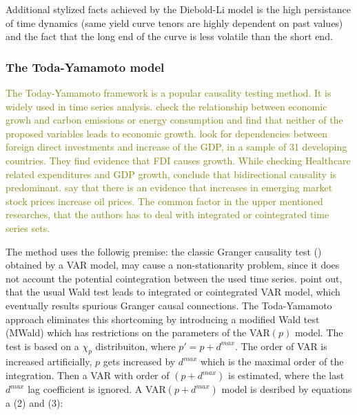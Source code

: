 \documentclass[12pt,bibliography=totoc]{article}
\begin{document}
Additional stylized facts achieved by the Diebold-Li model is the high persistance of time dynamics (same yield curve tenors are highly dependent on past values) and the fact that the long end of the curve is less volatile than the short end.


\subsubsection{The Toda-Yamamoto model}

\textcolor{olive}{The Today-Yamamoto framework is a popular causality testing method. It is widely used in time series analysis. \cite{zhang2009energy} check the relationship between economic growh and carbon emissions or energy consumption and find that neither of the proposed variables leads to economic growth. \cite{hansen2006causal} look for dependencies between foreign direct investments and increase of the GDP, in a sample of 31 developing countries. They find evidence that FDI causes growth.  While checking Healthcare related expenditures and GDP growth, \cite{amiri2012granger} conclude that bidirectional causality is predominant. \cite{basher2012oil} say that there is an evidence that increases in emerging market stock prices increase oil prices. The common factor in the upper mentioned researches, that the authors has to deal with integrated or cointegrated time series sets.}

The \cite{toda1995statistical} method uses the followig premise: the classic Granger causality test (\cite{granger1969investigating}) obtained by a VAR model, may cause a non-stationarity problem, since it does not account the potential cointegration between the used time series.
\cite{toda1995statistical} point out, that the usual Wald test leads to integrated or cointegrated VAR model, which eventually results spurious Granger causal connections. The Toda-Yamamoto approach eliminates this shortcoming by introducing a modified Wald test (MWald) which has restrictions on the parameters of the VAR$(p)$ model. The test is based on a  $\chi_{p}$  distribuiton, where $p' = p + d^{max}$. The order of VAR is increased artificially, $p$ gets increased by $d^{max}$ which is the maximal order of the integration. Then a VAR with order of $(p + d^{max})$ is estimated, where the last  $d^{max}$ lag coefficient is ignored. A VAR$(p + d^{max})$  model is desribed by equations a (2) and (3):
\end{document}

